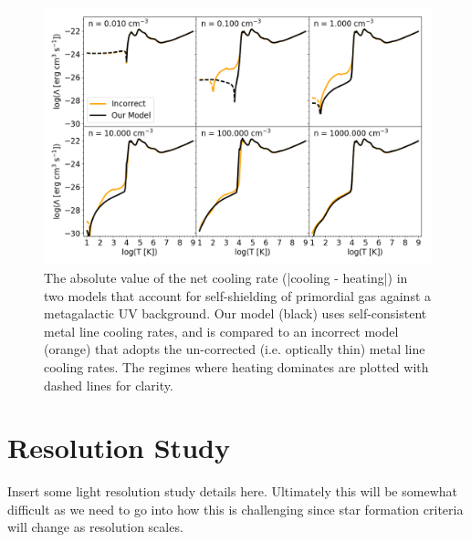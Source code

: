 \documentclass[twocolumn]{aastex61}
\begin{document}
\begin{figure}
\centering
\includegraphics[width=0.95\linewidth]{cooling_model_comparison}
\caption{The absolute value of the net cooling rate (|cooling - heating|) in two models that account for self-shielding of primordial gas against a metagalactic UV background. Our model (black) uses self-consistent metal line cooling rates, and is compared to an incorrect model (orange) that adopts the un-corrected (i.e. optically thin) metal line cooling rates. The regimes where heating dominates are plotted with dashed lines for clarity.}
\label{fig:cooling comparison}
\end{figure}

\section{Resolution Study}
\label{appendix:resolution study}
Insert some light resolution study details here. Ultimately this will be somewhat difficult as we need to go into how this is challenging since star formation criteria will change as resolution scales.

\end{document}

